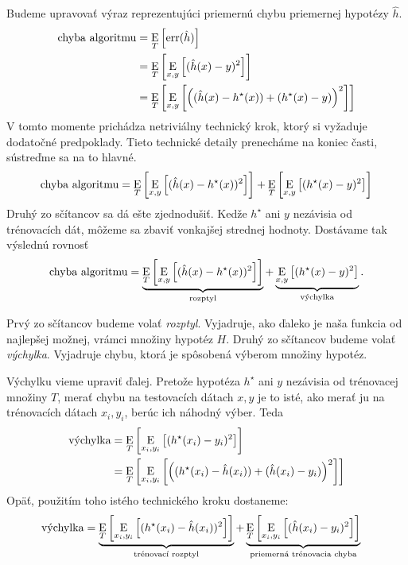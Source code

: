 Budeme upravovať výraz reprezentujúci priemernú chybu priemernej
hypotézy $\hat{h}$.
\begin{align}
  \chalg %
    &= \E_T \left[ \err(\hat{h}) \right] \\
    &= \E_T \left[ \E_{x,y} \left[ (\hat{h}(x) - y)^2 \right] \right] \\
    &= \E_T \left[ \E_{x,y} \left[ \left( (\hat{h}(x) - h^\star(x)) + (h^\star(x) - y) \right)^2 \right] \right]
\end{align}
V tomto momente prichádza netriviálny technický krok, ktorý si
vyžaduje dodatočné predpoklady. Tieto technické detaily prenecháme
na koniec časti, sústreďme sa na to hlavné.
$$
  \chalg
    = \E_T \left[ \E_{x,y} \left[ (\hat{h}(x) - h^\star(x))^2 \right] \right]
    + \E_T \left[ \E_{x,y} \left[ (h^\star(x) - y)^2 \right] \right]
$$
Druhý zo sčítancov sa dá ešte zjednodušiť. Kedže $h^\star$ ani $y$
nezávisia od trénovacích dát, môžeme sa zbaviť vonkajšej strednej
hodnoty. Dostávame tak výslednú rovnosť
$$
  \chalg
    = \underbrace{\E_T \left[ \E_{x,y} \left[ (\hat{h}(x) - h^\star(x))^2 \right] \right]}_{\text{rozptyl}}
    + \underbrace{\E_{x,y} \left[ (h^\star(x) - y)^2 \right]}_{\text{výchylka}}.
$$

Prvý zo sčítancov budeme volať \emph{rozptyl}. Vyjadruje, ako ďaleko je naša
funkcia od najlepšej možnej, vrámci množiny hypotéz $H$. Druhý zo sčítancov
budeme volať \emph{výchylka}. Vyjadruje chybu, ktorá je spôsobená výberom
množiny hypotéz.

Výchylku vieme upraviť ďalej. Pretože hypotéza $h^\star$ ani $y$ nezávisia od
trénovacej množiny $T$, merať chybu na testovacích dátach $x, y$ je to
isté, ako merať ju na trénovacích dátach $x_i, y_i$, berúc ich náhodný
výber. Teda
\begin{align}
  \vychylka
    &= \E_T \left[ \E_{x_i, y_i} \left[ (h^\star(x_i) - y_i)^2 \right] \right] \\
    &= \E_T \left[ \E_{x_i, y_i} \left[ \left( (h^\star(x_i) - \hat{h}(x_i)) + (\hat{h}(x_i) - y_i) \right)^2 \right] \right]
\end{align}
Opäť, použitím toho istého technického kroku dostaneme:
\begin{align}
  \vychylka &= \underbrace{\E_T \left[ \E_{x_i, y_i} \left[ (h^\star(x_i) - \hat{h}(x_i))^2 \right] \right]}_{\text{trénovací rozptyl}}
    + \underbrace{\E_T \left[ \E_{x_i, y_i} \left[ (\hat{h}(x_i) - y_i)^2 \right] \right]}_{\text{priemerná trénovacia chyba}}
\end{align}

